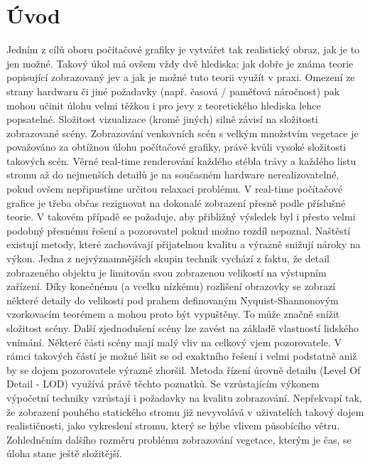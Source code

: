 \chapter{Úvod}
Jedním z cílů oboru počítačové grafiky je vytvářet tak realistický obraz, jak je to jen možné. Takový úkol má ovšem vždy dvě hlediska: jak dobře je známa teorie popisující zobrazovaný jev a jak je možné tuto teorii využít v praxi. Omezení ze strany hardwaru či jiné požadavky (např. časová / paměťová náročnost) pak mohou učinit úlohu velmi těžkou i pro jevy z teoretického hlediska lehce popsatelné. Složitost vizualizace (kromě jiných) silně závisí na složitosti zobrazované scény. 
Zobrazování venkovních scén s velkým množstvím vegetace je považováno za obtížnou úlohu počítačové grafiky, právě kvůli vysoké složitosti takových scén. Věrné real-time renderování každého stébla trávy a každého listu stromu až do nejmenších detailů je na současném hardware nerealizovatelné, pokud ovšem nepřipustíme určitou relaxaci problému. V real-time počítačové grafice je třeba občas rezignovat na dokonalé zobrazení přesně podle příslušné teorie. V takovém případě se požaduje, aby přibližný výsledek byl i přesto velmi podobný přesnému řešení a pozorovatel pokud možno rozdíl nepoznal. Naštěstí existují metody, které zachovávají přijatelnou kvalitu a výrazně snižují nároky na výkon. Jedna z nejvýznamnějších skupin technik vychází z faktu, že detail zobrazeného objektu je limitován svou zobrazenou velikostí na výstupním zařízení. Díky konečnému (a vcelku nízkému) rozlišení obrazovky se zobrazí některé detaily do velikosti pod prahem definovaným Nyquist-Shannonovým vzorkovacím teorémem a mohou proto být vypuštěny. To může značně snížit složitost scény. Další zjednodušení scény lze zavést na základě vlastností lidského vnímání. Některé části scény mají malý vliv na celkový vjem pozorovatele. V rámci takových částí je možné lišit se od exaktního řešení i velmi podstatně aniž by se dojem pozorovatele výrazně zhoršil. Metoda řízení úrovně detailu (Level Of Detail - LOD) využívá právě těchto poznatků.
Se vzrůstajícím výkonem výpočetní techniky vzrůstají i požadavky na kvalitu zobrazování. Nepřekvapí tak, že zobrazení pouhého statického stromu již nevyvolává v uživatelích takový dojem realističnosti, jako vykreslení stromu, který se hýbe vlivem působícího větru. Zohledněním dalšího rozměru problému zobrazování vegetace, kterým je čas, se úloha stane ještě složitější.
